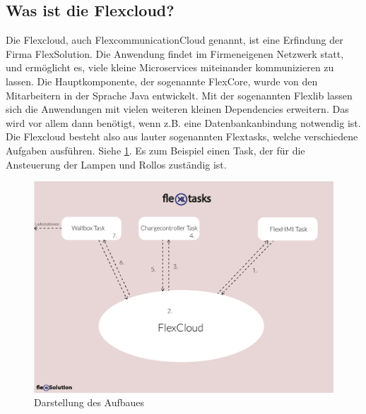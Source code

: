 \subsection{Was ist die Flexcloud?} 





Die Flexcloud, auch FlexcommunicationCloud genannt, ist eine Erfindung der Firma FlexSolution. Die Anwendung findet im Firmeneigenen Netzwerk statt, und ermöglicht es, viele kleine Microservices miteinander kommunizieren zu lassen. Die Hauptkomponente, der sogenannte FlexCore, wurde von den Mitarbeitern in der Sprache Java entwickelt. Mit der sogenannten Flexlib lassen sich die Anwendungen mit vielen weiteren kleinen Dependencies erweitern. Das wird vor allem dann benötigt, wenn z.B. eine Datenbankanbindung notwendig ist. Die Flexcloud besteht also aus lauter sogenannten Flextasks, welche verschiedene Aufgaben ausführen. Siehe \ref{fig:impl:FlexcloudAnsicht}. Es zum Beispiel einen Task, der für die Ansteuerung der Lampen und Rollos zuständig ist.

\begin{figure}[h t]
    \centering
    \includegraphics[scale=0.7]{pics/flexTasks2.png}
    \caption{Darstellung des Aufbaues}
    \label{fig:impl:FlexcloudAnsicht}
\end{figure}




